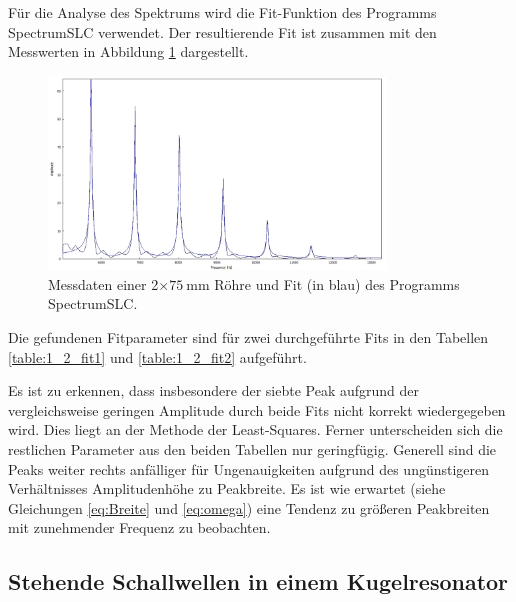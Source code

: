 Für die Analyse des Spektrums wird die Fit-Funktion des Programms SpectrumSLC\cite{skript} verwendet. Der resultierende Fit ist zusammen mit den Messwerten in Abbildung \ref{fig:1_2} dargestellt.
\begin{figure}
  \centering
  \includegraphics[width=0.8\textwidth]{messdaten/1--2Fit.jpg}
  \caption{Messdaten einer 2$\times\SI{75}{\milli\meter}$ Röhre und Fit (in blau) des Programms SpectrumSLC.}
  \label{fig:1_2}
\end{figure}
Die gefundenen Fitparameter sind für zwei durchgeführte Fits in den Tabellen \ref{table:1_2_fit1} und \ref{table:1_2_fit2} aufgeführt.


Es ist zu  erkennen, dass insbesondere der siebte Peak aufgrund der vergleichsweise geringen Amplitude durch beide Fits nicht korrekt wiedergegeben wird. Dies liegt an der Methode der Least-Squares. Ferner unterscheiden sich die restlichen Parameter aus den beiden Tabellen nur geringfügig. Generell sind die Peaks weiter rechts anfälliger für Ungenauigkeiten aufgrund des ungünstigeren Verhältnisses Amplitudenhöhe zu Peakbreite.
Es ist wie erwartet (siehe Gleichungen \eqref{eq:Breite} und \eqref{eq:omega}) eine Tendenz zu größeren Peakbreiten mit zunehmender Frequenz zu beobachten.

\subsection{Stehende Schallwellen in einem Kugelresonator}
